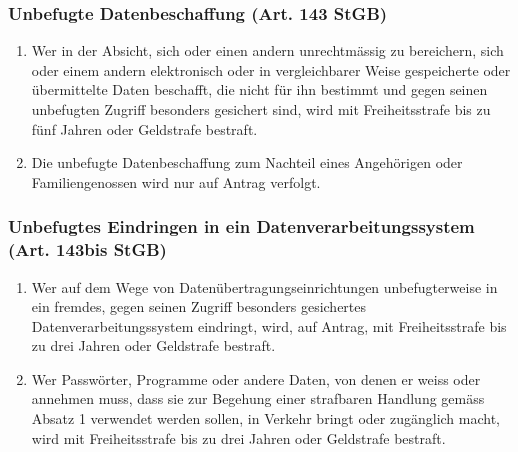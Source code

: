 \subsubsection{Unbefugte Datenbeschaffung (Art. 143 StGB)}
\label{sec:CD-Datenbeschaffung}
\begin{enumerate}
	\tightlist
	\item Wer in der Absicht, sich oder einen andern unrechtmässig zu
	bereichern, sich oder einem andern elektronisch oder in
	vergleichbarer Weise gespeicherte oder übermittelte Daten
	beschafft, die nicht für ihn bestimmt und gegen seinen unbefugten
	Zugriff besonders gesichert sind, wird mit Freiheitsstrafe bis zu fünf
	Jahren oder Geldstrafe bestraft.
	\item Die unbefugte Datenbeschaffung zum Nachteil eines Angehörigen
	oder Familiengenossen wird nur auf Antrag verfolgt.
\end{enumerate}

\subsubsection{Unbefugtes Eindringen in ein Datenverarbeitungssystem (Art. 143bis StGB)}
\label{sec:CD-Eindringen}
\begin{enumerate}
	\tightlist
	\item Wer auf dem Wege von Datenübertragungseinrichtungen
	unbefugterweise in ein fremdes, gegen seinen Zugriff besonders gesichertes
	Datenverarbeitungssystem eindringt, wird, auf Antrag, mit Freiheitsstrafe
	bis zu drei Jahren oder Geldstrafe bestraft.
	\item Wer Passwörter, Programme oder andere Daten, von denen er weiss oder
	annehmen muss, dass sie zur Begehung einer strafbaren Handlung gemäss
	Absatz 1 verwendet werden sollen, in Verkehr bringt oder zugänglich
	macht, wird mit Freiheitsstrafe bis zu drei Jahren oder Geldstrafe bestraft.
\end{enumerate}

